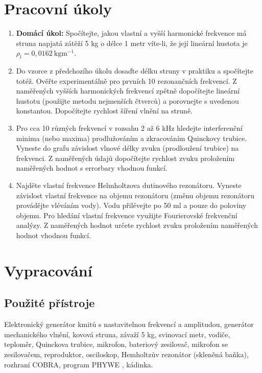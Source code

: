 \documentclass[english]{article}
\newcommand{\unit}[1]{\mathrm{#1}}
\begin{document}




\setlength{\parindent}{0.5cm}

\section{Pracovní úkoly}
\begin{enumerate}
 \item \textbf{Domácí úkol:} Spočítejte, jakou vlastní a vyšší harmonické frekvence má struna napjatá zátěží 5 kg o délce 1 metr víte-li, že její lineární hustota je $\rho_l=0,0162\ \unit{kgm^{-1}}$.
 \item Do vzorce z předchozího úkolu dosaďte délku struny v praktiku a spočítejte totéž. Ověřte experimentálně pro prvních 10 rezonančních frekvencí. Z naměřených vyšších harmonických frekvencí zpětně dopočítejte lineární hustotu (použijte metodu nejmenších čtverců) a porovnejte s uvedenou konstantou. Dopočítejte rychlost šíření vlnění na struně. 
 \item Pro cca 10 různých frekvencí v rozsahu 2 až 6 kHz hledejte interferenční minima (nebo maxima) prodlužováním a zkracováním Quinckovy trubice. Vyneste do grafu závislost vlnové délky zvuku (prodloužení trubice) na frekvenci. Z naměřených údajů dopočítejte rychlost zvuku proložením naměřených hodnot s errorbary vhodnou funkcí.
 \item Najděte vlastní frekvence Helmholtzova dutinového rezonátoru. Vyneste závislost vlastní frekvence na objemu rezonátoru (změnu objemu rezonátoru provádějte vléváním vody). Vodu přilévejte po 50 ml a pouze do poloviny objemu. Pro hledání vlastní frekvence využijte Fourierovské frekvenční analýzy. Z naměřených hodnot určete rychlost zvuku proložením naměřených hodnot vhodnou funkcí.
\end{enumerate}

\section{Vypracování}

\subsection{Použité přístroje}
	Elektronický generátor kmitů s nastavitelnou frekvencí a amplitudou, generátor mechanického vlnění, kovová struna, závaží 5 kg, svinovací metr, vodiče, teploměr, Quinckova trubice, mikrofon, bateriový zesilovač, mikrofon se zesilovačem, reproduktor, osciloskop, Hemholtzův rezonátor (skleněná baňka), rozhraní COBRA, program PHYWE \cite{bib:phywe}, kádinka.
\end{document}

